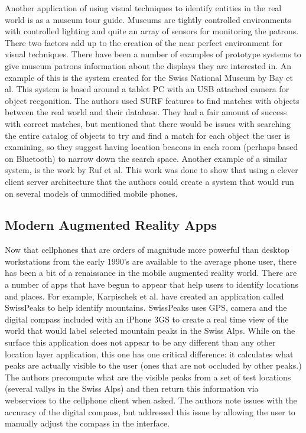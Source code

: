 \documentclass{acm_proc_article-sp}
\begin{document}
Another application of using visual techniques to identify entities in the real world is as a museum tour guide.  Museums are tightly controlled environments with controlled lighting and quite an array of sensors for monitoring the patrons. There two factors add up to the creation of the near perfect environment for visual techniques.   There have been a number of examples of prototype systems to give museum patrons information about the displays they are interested in.  An example of this is the system created for the Swiss National Museum by Bay et al.  This system is based around a tablet PC with an USB attached camera for object recgonition.  The authors used SURF features to find matches with objects between the real world and their database.  They had a fair amount of success with correct matches, but mentioned that there would be issues with searching the entire catalog of objects to try and find a match for each object the user is examining, so they suggest having location beacons in each room (perhaps based on Bluetooth) to narrow down the search space. \cite{bay2006interactive}  Another example of a similar system, is the work by Ruf et al. \cite{ruf2010mobile}  This work was done to show that using a clever client server architecture that the authors could create a system that would run on several models of unmodified mobile phones.

\subsection{Modern Augmented Reality Apps}
Now that cellphones that are orders of magnitude more powerful than desktop workstations from the early 1990's are available to the average phone user, there has been a bit of a renaissance in the mobile augmented reality world.  
There are a number of apps that have begun to appear that help users to identify locations and places.  For example, Karpischek et al. have created an application called SwissPeaks to help identify mountains.  SwissPeaks uses GPS, camera and the digital compass included with an iPhone 3GS to create a real time view of the world that would label selected mountain peaks in the Swiss Alps.  While on the surface this application does not appear to be any different than any other location layer application, this one has one critical difference: it calculates what peaks are actually visible to the user (ones that are not occluded by other peaks.)  The authors precompute what are the visible peaks from a set of test locations (several vallys in the Swiss Alps) and then return this information via webservices to the cellphone client when asked.  The authors note issues with the accuracy of the digital compass, but addressed this issue by allowing the user to manually adjust the compass in the interface.  \cite{karpischek2009swisspeaks}
\end{document}
